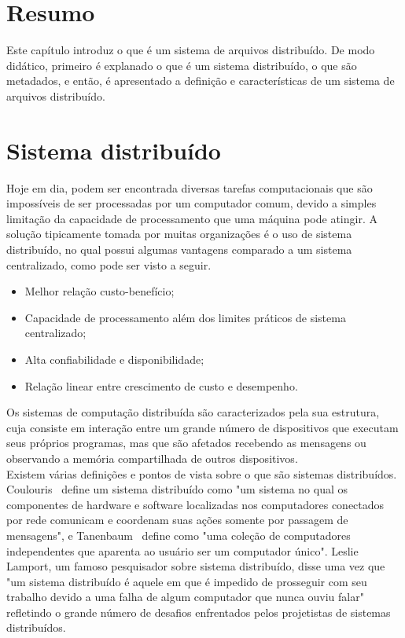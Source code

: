 \section{Resumo}
Este capítulo introduz o que é um sistema de arquivos distribuído. De modo didático, primeiro é explanado o que é um sistema distribuído, o que são metadados, e então, é apresentado a definição e características de um sistema de arquivos distribuído.


	
	\section{Sistema distribuído}
	Hoje em dia, podem ser encontrada diversas tarefas computacionais que são impossíveis de ser processadas por um computador comum, devido a simples limitação da capacidade de processamento que uma máquina pode atingir. A solução tipicamente tomada por muitas organizações é o uso de sistema distribuído, no qual possui algumas vantagens comparado a um sistema centralizado, como pode ser visto a seguir.
	
	\begin{itemize}
		\item Melhor relação custo-benefício;
		\item Capacidade de processamento além dos limites práticos de sistema centralizado;
		\item Alta confiabilidade e disponibilidade;
		\item Relação linear entre crescimento de custo e desempenho.
	\end{itemize}
	Os sistemas de computação distribuída são caracterizados pela sua estrutura, cuja consiste em interação entre um grande número de dispositivos que executam seus próprios programas, mas que são afetados recebendo as mensagens ou observando a memória compartilhada de outros dispositivos.
	\\
	
	Existem várias definições e pontos de vista sobre o que são sistemas distribuídos. Coulouris~\cite{coulouris06} define um sistema distribuído como "um sistema no qual os componentes de hardware e software localizadas nos computadores conectados por rede comunicam e coordenam suas ações somente por passagem de mensagens", e Tanenbaum~\cite{tanenbaum07} define como "uma coleção de computadores independentes que aparenta ao usuário ser um computador único". Leslie Lamport, um famoso pesquisador sobre sistema distribuído, disse uma vez que "um sistema distribuído é aquele em que é impedido de prosseguir com seu trabalho devido a uma falha de algum computador que nunca ouviu falar" refletindo o grande número de desafios enfrentados pelos projetistas de sistemas distribuídos.
	\\
	
